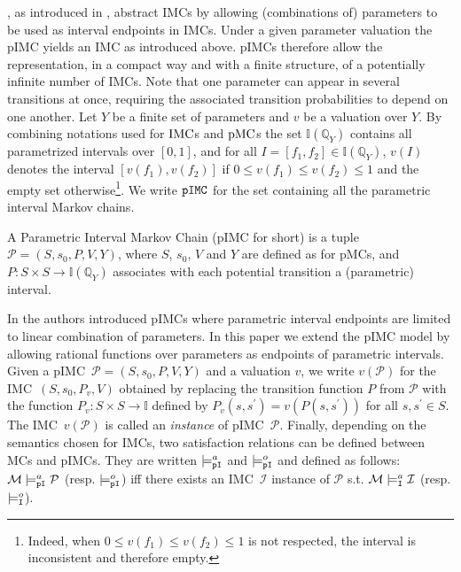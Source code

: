 \documentclass{llncs}
\newcommand{\mc}{\textnormal{MC}}
\newcommand{\imc}{\textnormal{IMC}}
\newcommand{\pimc}{\textnormal{pIMC}}
\newcommand{\pmc}{\textnormal{pMC}}
\newcommand{\pimcSet}{\ensuremath{\tt{pIMC}}}
\newcommand{\satisfactionImcOnce}{\ensuremath{\models^{o}_{\tt{I}}}}
\newcommand{\satisfactionImc}{\ensuremath{\models^{a}_{\tt{I}}}}
\newcommand{\satisfactionPimc}{\ensuremath{\models^a_{\tt{pI}}}}
\newcommand{\satisfactionPimcOnce}{\ensuremath{\models^o_{\tt{pI}}}}
\newcommand{\Inter}  {\ensuremath{{\mathbb{I}}}}
\newcommand{\Qset}             {\ensuremath{\mathbb{Q}}}
\newcommand{\custompar}[1]{\smallskip \noindent {\bf #1}}
\begin{document}
\custompar{Parametric Interval Markov Chains},
as introduced in \cite{DelahayeLP16}, abstract {\imc}s by allowing (combinations of)
parameters to be used as interval endpoints in {\imc}s. Under a given
parameter valuation the {\pimc} yields an {\imc} as introduced above.
{\pimc}s therefore allow the representation, in a compact way and with a
finite structure, of a potentially infinite number of {\imc}s. Note that
one parameter can appear in several transitions at once, requiring the
associated transition probabilities to depend on one another.
Let $Y$ be a finite set of
parameters and $v$ be a valuation over $Y$.  By combining notations
used for $\imc$s and $\pmc$s the set $\Inter(\Qset_Y)$ contains all
parametrized intervals over $[0,1]$, and for all $I
= [f_1, f_2] \in \Inter(\Qset_Y)$, $v(I)$ denotes the interval
$[v(f_1), v(f_2)]$ if $0 \le v(f_1) \leq v(f_2) \le 1$ and the empty set
otherwise\footnote{Indeed, when $0 \le v(f_1) \leq v(f_2) \le 1$ is not respected, the interval is inconsistent and therefore empty.}.
We write $\pimcSet$ for the set containing all the parametric interval Markov chains.


\begin{definition}\label{def:pimc}
	A Parametric Interval Markov Chain ({\pimc} for short) is a tuple $\mathcal{P} = (S,s_0,P,V,Y)$, 
	where $S$, $s_0$, $V$ and $Y$ are defined as for {\pmc}s, 
	and 
	$P : S \times S \to \Inter(\Qset_Y)$ 
    associates with each potential transition a (parametric) interval.
\end{definition}

In \cite{DelahayeLP16} the authors introduced {\pimc}s where parametric interval
endpoints are limited to linear combination of parameters.  In this paper we extend the {\pimc} model by allowing rational
functions over parameters as endpoints of parametric intervals.  Given
a \pimc\ $\mathcal{P} =(S,s_0,P,V,Y)$ and a valuation $v$, we write
$v(\mathcal{P})$ for the \imc\ $(S,s_0,P_v,V)$ obtained by replacing
the transition function $P$ from $\mathcal{P}$ with the function $P_v
: S \times S \to \Inter$ defined by $P_v(s,s^\prime) =
v(P(s,s^\prime))$ for all $s,s^\prime \in S$.
The \imc\ $v(\mathcal{P})$ is called an {\em instance} of
\pimc\ $\mathcal{P}$.  Finally, depending on the semantics chosen for
       {\imc}s, two satisfaction relations can be defined between
       {\mc}s and {\pimc}s. They are written $\satisfactionPimc$ and
       $\satisfactionPimcOnce$ and defined as follows: $\mathcal{M}
       \satisfactionPimc \mathcal{P}$ (resp. $\satisfactionPimcOnce$)
       iff there exists an \imc\ $\mathcal{I}$ instance of
       $\mathcal{P}$ s.t. $\mathcal{M} \satisfactionImc
       \mathcal{I}$ (resp. $\satisfactionImcOnce$).
\end{document}

